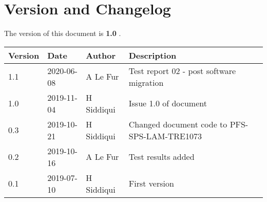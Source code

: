 \section{Version and Changelog}

The version of this document is {\bf 1.0} .

\begin{table}[H]
    \begin{tabular}{|l|l|l|p{10cm}| }
    \hline
    {\bf Version} & {\bf Date} & {\bf Author} & {\bf Description} \\ \hline
    1.1 & 2020-06-08 & A Le Fur & Test report 02 - post software migration\\ \hline
    1.0 & 2019-11-04 & H Siddiqui & Issue 1.0 of document\\ \hline
    0.3 & 2019-10-21 & H Siddiqui & Changed document code to PFS-SPS-LAM-TRE1073 \\ \hline
    0.2 & 2019-10-16 & A Le Fur & Test results added \\ \hline
    0.1 & 2019-07-10 & H Siddiqui & First version \\ \hline
    \end{tabular}
\end{table}
